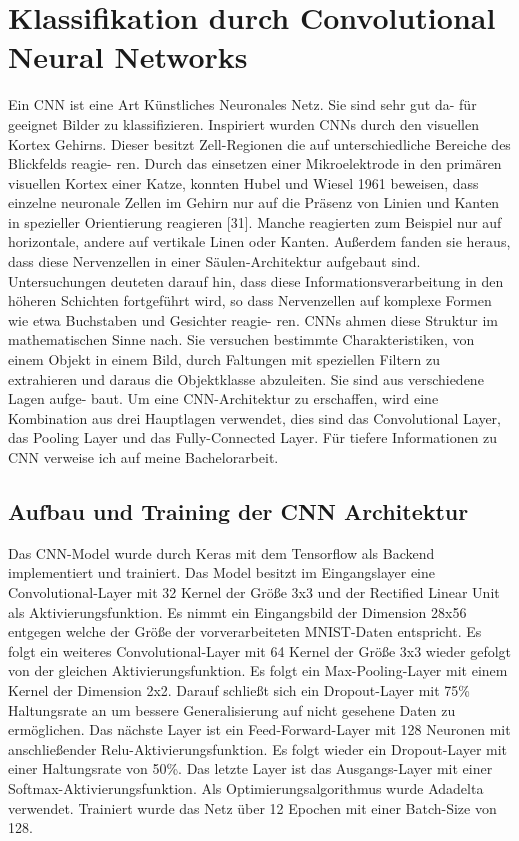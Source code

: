 {{{{{{{{{\begin{center}
\end{center}


\section{Klassifikation durch Convolutional Neural Networks}
\label{sec:Klassifikation durch Convolutional Neural Networks}

Ein CNN ist eine Art Künstliches Neuronales Netz. Sie sind sehr gut da-
für geeignet Bilder zu klassifizieren. Inspiriert wurden CNNs durch den visuellen Kortex Gehirns. Dieser besitzt Zell-Regionen die auf unterschiedliche Bereiche des Blickfelds reagie-
ren. Durch das einsetzen einer Mikroelektrode in den prim\"aren visuellen Kortex einer Katze,
konnten Hubel und Wiesel 1961 beweisen, dass einzelne neuronale Zellen im Gehirn nur auf die
Pr\"asenz von Linien und Kanten in spezieller Orientierung reagieren [31]. Manche reagierten
zum Beispiel nur auf horizontale, andere auf vertikale Linen oder Kanten. Au{\ss}erdem fanden sie
heraus, dass diese Nervenzellen in einer S\"aulen-Architektur aufgebaut sind. Untersuchungen
deuteten darauf hin, dass diese Informationsverarbeitung in den höheren Schichten fortgef\"uhrt
wird, so dass Nervenzellen auf komplexe Formen wie etwa Buchstaben und Gesichter reagie-
ren. CNNs ahmen diese Struktur im mathematischen Sinne nach. Sie versuchen bestimmte
Charakteristiken, von einem Objekt in einem Bild, durch Faltungen mit speziellen Filtern zu
extrahieren und daraus die Objektklasse abzuleiten. Sie sind aus verschiedene Lagen aufge-
baut. Um eine CNN-Architektur zu erschaffen, wird eine Kombination aus drei Hauptlagen
verwendet, dies sind das Convolutional Layer, das Pooling Layer und das Fully-Connected
Layer. Für tiefere Informationen zu CNN verweise ich auf meine Bachelorarbeit.


\subsection{Aufbau und Training der CNN Architektur}
\label{subsec:Aufbau und Training der CNN Architektur}

Das CNN-Model wurde durch Keras mit dem Tensorflow als Backend implementiert und trainiert. Das Model besitzt im Eingangslayer eine Convolutional-Layer mit 32 Kernel der Gr\"o{\ss}e  3x3 und der Rectified Linear Unit als Aktivierungsfunktion. Es nimmt ein Eingangsbild der Dimension 28x56 entgegen welche der Gr\"o{\ss}e der vorverarbeiteten MNIST-Daten entspricht.
Es folgt ein weiteres Convolutional-Layer mit 64 Kernel der Gr\"o{\ss}e 3x3 wieder gefolgt von der gleichen Aktivierungsfunktion. Es folgt ein Max-Pooling-Layer mit einem Kernel der Dimension 2x2. Darauf schlie{\ss}t sich ein Dropout-Layer mit 75\% Haltungsrate an um bessere Generalisierung auf nicht gesehene Daten zu erm\"oglichen.
Das n\"achste Layer ist ein Feed-Forward-Layer mit 128 Neuronen mit anschlie{\ss}ender Relu-Aktivierungsfunktion. Es folgt wieder ein Dropout-Layer mit einer Haltungsrate von 50\%. Das letzte Layer ist das Ausgangs-Layer mit einer Softmax-Aktivierungsfunktion.
Als Optimierungsalgorithmus wurde Adadelta verwendet. Trainiert wurde das Netz über 12 Epochen mit einer Batch-Size von 128.


}}}}}}}}}
